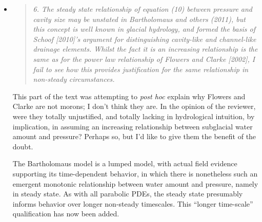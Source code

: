 \documentclass[11pt,reqno]{amsart}
\newcommand{\reply}[2]{
\medskip\medskip
\item  \begin{quote}
\emph{#1}
\end{quote}

\medskip
\noindent #2}
\begin{document}
\begin{itemize}
{The text of the manuscript never suggests such usage of equation (10).  The revised text makes this even more clear.}

\reply{6. The steady state relationship of equation (10) between pressure and cavity size may be unstated in Bartholomaus and others (2011), but this concept is well known in glacial hydrology, and formed the basis of Schoof [2010]’s argument for distinguishing cavity-like and channel-like drainage elements. Whilst the fact it is an increasing relationship is the same as for the power law relationship of Flowers and Clarke [2002], I fail to see how this provides justification for the same relationship in non-steady circumstances.}
{This part of the text was attempting to \emph{post hoc} explain why Flowers and Clarke are not morons; I don't think they are.  In the opinion of the reviewer, were they totally unjustified, and totally lacking in hydrological intuition, by implication, in assuming an increasing relationship between subglacial water amount and pressure?  Perhaps so, but I'd like to give them the benefit of the doubt.

The Bartholomaus model is a lumped model, with actual field evidence supporting its time-dependent behavior, in which there is nonetheless such an emergent monotonic relationship between water amount and pressure, namely in steady state.  As with all parabolic PDEs, the steady state presumably informs behavior over longer non-steady timescales.  This ``longer time-scale'' qualification has now been added.}
\end{itemize}
\end{document}
